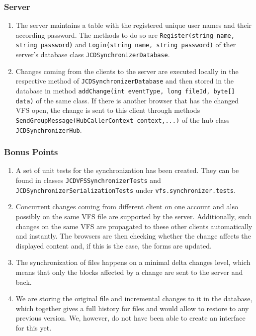 \documentclass[a4paper,12pt]{article}
\begin{document}
\subsubsection{Server}
\begin{enumerate}
	\item The server maintains a table with the registered unique user names and their according password. The methods to do so are \texttt{Register(string name, string password)} and \texttt{Login(string name, string password)} of ther server's database class \texttt{JCDSynchronizerDatabase}.
	\item Changes coming from the clients to the server are executed locally in the respective method of \texttt{JCDSynchronizerDatabase} and then stored in the database in method \texttt{addChange(int eventType, long fileId, byte[] data)} of the same class. If there is another browser that has the changed VFS open, the change is sent to this client through methods \texttt{SendGroupMessage(HubCallerContext context,...)} of the hub class \texttt{JCDSynchronizerHub}.
	\end{enumerate}

	\subsubsection{Bonus Points}
	\begin{enumerate}
	\item A set of unit tests for the synchronization has been created. They can be found in classes \texttt{JCDVFSSynchronizerTests} and \newline
	\texttt{JCDSynchronizerSerializationTests} under \texttt{vfs.synchronizer.tests}.
	\item Concurrent changes coming from different client on one account and also possibly on the same VFS file are supported by the server. Additionally, such changes on the same VFS are propagated to these other clients automatically and instantly. The browsers are then checking whether the change affects the displayed content and, if this is the case, the forms are updated.
	\item The synchronization of files happens on a minimal delta changes level, which means that only the blocks affected by a change are sent to the server and back.
	\item We are storing the original file and incremental changes to it in the database, which together gives a full history for files and would allow to restore to any previous version. We, however, do not have been able to create an interface for this yet.
	\end{enumerate}
\end{document}
